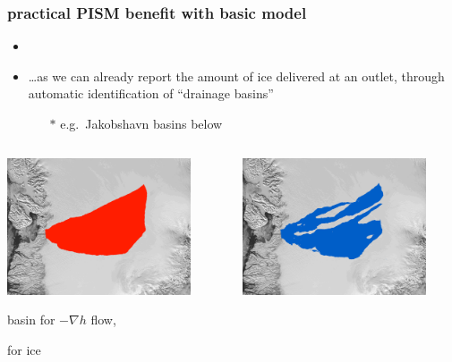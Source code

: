 \documentclass[hide notes,intlimits]{beamer}
\begin{document}
\begin{frame}
  \frametitle{practical PISM benefit with basic model}
 
\begin{itemize}
\item  {}
\item \dots as we can already report the amount of ice delivered at an outlet, through automatic identification of ``drainage basins''
  \begin{itemize}
  \item[$\ast$] e.g.~Jakobshavn basins below
  \end{itemize}
\end{itemize}

\vspace{-5mm}

\begin{columns}
\begin{column}{0.5\textwidth}
\begin{center}
\includegraphics[width=0.85\textwidth]{figs/ftt-mask}

basin for $-\nabla h$ flow,

\phantom{where $\phi$}

for ice
\end{center}
\end{column}
\begin{column}{0.5\textwidth}
\begin{center}
\vspace{0.5mm}

\includegraphics[width=0.85\textwidth]{figs/hydro-mask}


\end{center}
\end{column}
\end{columns}
\end{frame}
\end{document}
